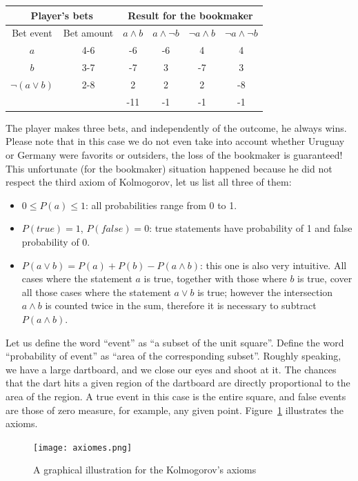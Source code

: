 \documentclass[notitlepage,oneside]{book}
\begin{document}
\vspace{2mm}
\begin{tabular}{cccccc}
	\multicolumn{2}{c}{Player's bets}  &  \multicolumn{4}{c}{Result for the bookmaker} \\
	\hline
	{\tiny Bet event} & {\tiny Bet amount} & {\tiny $a\wedge b$} & {\tiny $a\wedge \neg b$} &  {\tiny $\neg a\wedge b$} &  {\tiny $\neg a\wedge\neg b$} \\
	\hline
	$a$             & 4-6 & -6 & -6 &  4 &  4 \\
	$b$             & 3-7 & -7 &  3 & -7 &  3 \\
	$\neg(a\vee b)$ & 2-8 &  2 &  2 &  2 & -8 \\
	\hline
	&     &-11 & -1 & -1 & -1
\end{tabular}
\vspace{2mm}

The player makes three bets, and independently of the outcome, he always wins. 
Please note that in this case we do not even take into account whether Uruguay or Germany were favorits or outsiders, 
the loss of the bookmaker is guaranteed! 
This unfortunate (for the bookmaker) situation happened because he did not respect the third axiom of Kolmogorov, let us list all three of them:
\begin{itemize}
\item $0\leq P(a)\leq 1$: all probabilities range from 0 to 1.
\item $P(true)=1$, $P(false) = 0$: true statements have probability of 1 and false probability of 0.
\item $P(a\vee b) = P(a) + P(b) - P(a\wedge b)$: this one is also very intuitive.
All cases where the statement $a$ is true, together with those where $b$ is true,
cover all those cases where the statement $a\vee b$ is true; however the intersection $a\wedge b$ is counted twice in the sum, therefore it is necessary to subtract $P(a\wedge b)$.
\end{itemize}

Let us define the word ``event'' as ``a subset of the unit square''. 
Define the word ``probability of event'' as ``area of the corresponding subset''. 
Roughly speaking, we have a large dartboard, and we close our eyes and shoot at it. 
The chances that the dart hits a given region of the dartboard are directly proportional to the area of the region. 
A true event in this case is the entire square, and false events are those of zero measure, for example, any given point. 
Figure~\ref{fig:kolmogorov} illustrates the axioms.
\begin{figure}[htb!]
\centering
\texttt{[image: axiomes.png]}
\caption{A graphical illustration for the Kolmogorov's axioms}
\label{fig:kolmogorov}
\end{figure}
\end{document}
